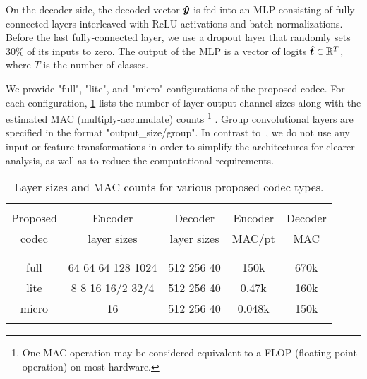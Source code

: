 On the decoder side, the decoded vector ${\boldsymbol{\hat{y}}}$ is fed into an MLP consisting of fully-connected layers interleaved with ReLU activations and batch normalizations.
Before the last fully-connected layer, we use a dropout layer that randomly sets 30\% of its inputs to zero.
The output of the MLP is a vector of logits ${\boldsymbol{\hat{t}}} \in \mathbb{R}^T$, where $T$ is the number of classes.

We provide "full", "lite", and "micro" configurations of the proposed codec.
For each configuration, \cref{tbl:layers} lists the number of layer output channel sizes along with the estimated MAC (multiply-accumulate) counts%
\footnote{One MAC operation may be considered equivalent to a FLOP (floating-point operation) on most hardware.}%
.
Group convolutional layers are specified in the format "output\_size/group".
In contrast to~\cite{qi2016pointnet}, we do not use any input or feature transformations in order to simplify the architectures for clearer analysis, as well as to reduce the computational requirements.

%
%


\begin{table}[t]
  \centering
  \caption[Layer sizes and MAC counts for various proposed codec types]{%
    Layer sizes and MAC counts for various proposed codec types.%
  }
  \label{tbl:layers}
  \scriptsize
  \setlength{\tablesepskip}{-0.9\normalbaselineskip}
  \begin{tabular}[]{ccccc}
    \toprule
    \\[\tablesepskip]
    Proposed           & Encoder           & Decoder                      & Encoder            & Decoder   \\
    codec              & layer sizes       & layer sizes                  & MAC/pt             & MAC       \\
    \\[\tablesepskip]
    \midrule
    \\[\tablesepskip]
    full               & 64 64 64 128 1024 & 512 256 40                   & 150k               & 670k      \\
    lite               & 8 8 16 16/2 32/4  & 512 256 40                   & 0.47k              & 160k      \\
    micro              & 16                & 512 256 40                   & 0.048k             & 150k      \\
    \\[\tablesepskip]
    \bottomrule
  \end{tabular}
\end{table}



